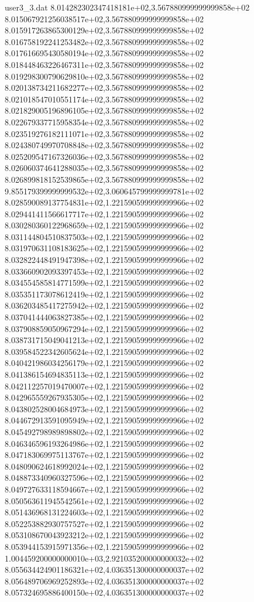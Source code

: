 \begin{filecontents}{user3_3.dat}
8.014282302347418181e+02,3.567880999999999858e+02
8.015067921256038517e+02,3.567880999999999858e+02
8.015917263865300129e+02,3.567880999999999858e+02
8.016758192241253482e+02,3.567880999999999858e+02
8.017616695430580194e+02,3.567880999999999858e+02
8.018448463226467311e+02,3.567880999999999858e+02
8.019298300790629810e+02,3.567880999999999858e+02
8.020138734211682277e+02,3.567880999999999858e+02
8.021018547010551174e+02,3.567880999999999858e+02
8.021829005196896105e+02,3.567880999999999858e+02
8.022679337715958354e+02,3.567880999999999858e+02
8.023519276182111071e+02,3.567880999999999858e+02
8.024380749970708848e+02,3.567880999999999858e+02
8.025209547167326036e+02,3.567880999999999858e+02
8.026060374641288035e+02,3.567880999999999858e+02
8.026899818152539865e+02,3.567880999999999858e+02
9.855179399999999532e+02,3.060645799999999781e+02
8.028590089137754831e+02,1.221590599999999966e+02
8.029441411566617717e+02,1.221590599999999966e+02
8.030280360122968659e+02,1.221590599999999966e+02
8.031144804510837503e+02,1.221590599999999966e+02
8.031970631108183625e+02,1.221590599999999966e+02
8.032822448491947398e+02,1.221590599999999966e+02
8.033660902093397453e+02,1.221590599999999966e+02
8.034554585814771599e+02,1.221590599999999966e+02
8.035351173078612419e+02,1.221590599999999966e+02
8.036203485417275942e+02,1.221590599999999966e+02
8.037041444063827385e+02,1.221590599999999966e+02
8.037908859050967294e+02,1.221590599999999966e+02
8.038731715049041213e+02,1.221590599999999966e+02
8.039584522342605624e+02,1.221590599999999966e+02
8.040421986034256179e+02,1.221590599999999966e+02
8.041386154694835113e+02,1.221590599999999966e+02
8.042112257019470007e+02,1.221590599999999966e+02
8.042965559267935305e+02,1.221590599999999966e+02
8.043802528004684973e+02,1.221590599999999966e+02
8.044672913591095949e+02,1.221590599999999966e+02
8.045492798989898802e+02,1.221590599999999966e+02
8.046346596193264986e+02,1.221590599999999966e+02
8.047183069975113767e+02,1.221590599999999966e+02
8.048090624618992024e+02,1.221590599999999966e+02
8.048873340960327596e+02,1.221590599999999966e+02
8.049727633118594667e+02,1.221590599999999966e+02
8.050563611945542561e+02,1.221590599999999966e+02
8.051436968131224603e+02,1.221590599999999966e+02
8.052253882930757527e+02,1.221590599999999966e+02
8.053108670043923212e+02,1.221590599999999966e+02
8.053944153915971356e+02,1.221590599999999966e+02
1.004459200000000010e+03,2.921035200000000032e+02
8.055634424901186321e+02,4.036351300000000037e+02
8.056489706969252893e+02,4.036351300000000037e+02
8.057324695886400150e+02,4.036351300000000037e+02

\end{filecontents}
